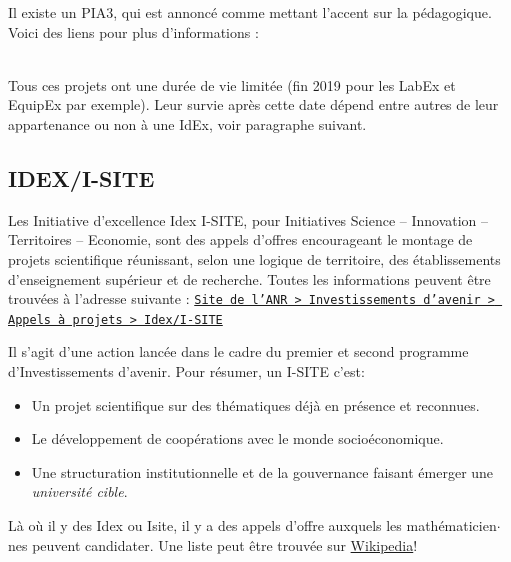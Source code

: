 Il existe un PIA3, qui est annonc{\'e} comme mettant l'accent sur la p{\'e}dagogique.
Voici des liens pour plus d'informations : \\
 \\

Tous ces projets ont une dur{\'e}e de vie limit{\'e}e (fin 2019 pour les LabEx et EquipEx par exemple). 
Leur survie apr{\`e}s cette date d{\'e}pend entre autres de leur appartenance ou non {\`a} une IdEx, voir paragraphe suivant.

\subsection{IDEX/I-SITE}

Les Initiative d'excellence Idex I-SITE, pour Initiatives Science – Innovation –Territoires – Economie, sont des appels d'offres encourageant le montage de projets scientifique r\'eunissant, selon une logique de territoire, des \'etablissements d'enseignement sup\'erieur et de recherche. Toutes les informations
peuvent \^etre trouv\'ees \`a l'adresse suivante :
\href{http://www.agence-nationale-recherche.fr/investissements-d-avenir/appels-a-projets/2014/initiatives-dexcellence-idex-initiatives-science-innovation-territoires-economie-i-site/?L=jae}{%
\texttt{Site de l'ANR > Investissements d'avenir > Appels \`a projets > Idex/I-SITE}}

Il s'agit d’une action lanc{\'e}e dans le cadre du premier et second programme d'Investissements d’avenir. 
Pour r{\'e}sumer, un I-SITE c'est:
\begin{itemize}
 \item Un projet scientifique sur des th{\'e}matiques d{\'e}j{\`a} en pr{\'e}sence et reconnues.
 \item Le d{\'e}veloppement de coop{\'e}rations avec le monde socio{\'e}conomique.
 \item Une structuration institutionnelle et de la gouvernance faisant {\'e}merger une \textit{universit{\'e} cible}.
\end{itemize}

L{\`a} o{\`u} il y des Idex ou Isite, il y a des appels d'offre auxquels les math\'ematicien$\cdot$nes peuvent candidater.
Une liste peut {\^e}tre trouv{\'e}e sur \href{https://fr.wikipedia.org/wiki/Initiative_d'excellence}{Wikipedia}!

